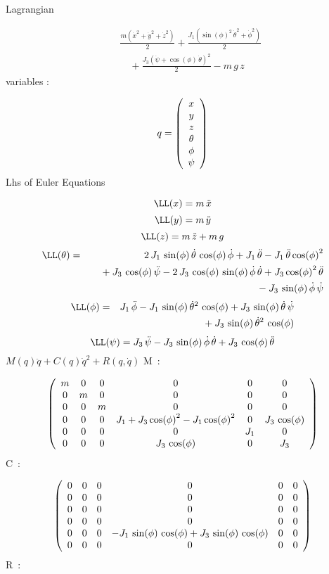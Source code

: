 Lagrangian
 
\begin{eqnarray*} && \frac{m\left(\dot{x}^2+\dot{y}^2+\dot{z}^2\right)
}{2} + \frac{J_{1}\left({\sin(\phi)}^2\,\dot{\theta}^2+\dot{\phi}^2
\right)}{2} \\ &&\quad\mbox{} + \frac{J_{3}\left(\dot{\psi}+\cos(\phi)
\,\dot{\theta}\right)^2}{2} - m\,g\,z \end{eqnarray*}
variables :
 
\[  q  = \left( \begin{array}{c} x \cr y \cr z \cr \theta \cr \phi
 \cr \psi \end{array} \right)  \]
Lhs of Euler Equations
 
\[ \LL(x) = m\,\ddot{x} \]
\[ \LL(y) = m\,\ddot{y} \]
\[ \LL(z) = m\,\ddot{z} + m\,g \]
\begin{eqnarray*} \LL(\theta) &=& 2\,J_{1}\,\sin(\phi)\,\dot{\theta}\,
\cos(\phi)\,\dot{\phi} + J_{1}\,\ddot{\theta} - J_{1}\,\ddot{\theta}\,
{\cos(\phi)}^2 \\ &&\quad\mbox{} + J_{3}\,\cos(\phi)\,\ddot{\psi} - 2
\,J_{3}\,\cos(\phi)\,\sin(\phi)\,\dot{\phi}\,\dot{\theta} + J_{3}\,{
\cos(\phi)}^2\,\ddot{\theta} \\ &&\quad\mbox{} - J_{3}\,\sin(\phi)\,
\dot{\phi}\,\dot{\psi} \end{eqnarray*}
\begin{eqnarray*} \LL(\phi) &=& J_{1}\,\ddot{\phi} - J_{1}\,\sin(\phi)
\,\dot{\theta}^2\,\cos(\phi) + J_{3}\,\sin(\phi)\,\dot{\theta}\,
\dot{\psi} \\ &&\quad\mbox{} + J_{3}\,\sin(\phi)\,\dot{\theta}^2\,\cos
(\phi) \end{eqnarray*}
\[ \LL(\psi) = J_{3}\,\ddot{\psi} - J_{3}\,\sin(\phi)\,\dot{\phi}\,
\dot{\theta} + J_{3}\,\cos(\phi)\,\ddot{\theta} \]
$M(q)\ddot{q}+C(q)\dot{q}^2 +R(q,\dot{q})$
M~:
 
$$ \left( \begin{array}{cccccc} m & 0 & 0 & 0 & 0 & 0 \cr 0 & m & 0 & 
0 & 0 & 0 \cr 0 & 0 & m & 0 & 0 & 0 \cr 0 & 0 & 0 & J_{1}+J_{3}\,{\cos
(\phi)}^2-J_{1}\,{\cos(\phi)}^2 & 0 & J_{3}\,\cos(\phi) \cr 0 & 0 & 0
 & 0 & J_{1} & 0 \cr 0 & 0 & 0 & J_{3}\,\cos(\phi) & 0 & J_{3}
 \end{array} \right) $$
C~:
 
$$ \left( \begin{array}{cccccc} 0 & 0 & 0 & 0 & 0 & 0 \cr 0 & 0 & 0 & 
0 & 0 & 0 \cr 0 & 0 & 0 & 0 & 0 & 0 \cr 0 & 0 & 0 & 0 & 0 & 0 \cr 0 & 
0 & 0 & -J_{1}\,\sin(\phi)\,\cos(\phi)+J_{3}\,\sin(\phi)\,\cos(\phi)
 & 0 & 0 \cr 0 & 0 & 0 & 0 & 0 & 0 \end{array} \right) $$
R~:
 
